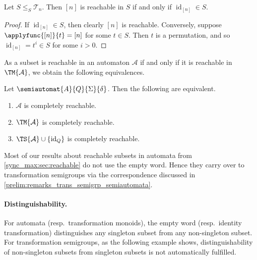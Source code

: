 \begin{proposition}\label{sync_max:prop:reach_whole_set}
	Let $S \le_S \mathcal T_n$.
	Then $[n]$ is reachable in $S$
	if and only if $\operatorname{id}_{[n]} \in S$.
\end{proposition}
\begin{proof}
	If $\operatorname{id}_{[n]} \in S$,
	then clearly $[n]$ is reachable. 
	Conversely, suppose $\applyfunc{[n]}{t} = [n]$
	for some $t \in S$.
	Then $t$ is a permutation, and so $\operatorname{id}_{[n]} = t^i \in S$
	for some $i > 0$.
\end{proof}

As a subset is reachable in an automaton $\mathcal A$ if and only if it is reachable in~$\TM{\mathcal A}$,
we obtain the following
equivalences.

\begin{proposition}
	Let $\semiautomat{A}{Q}{\Sigma}{\delta}$.
	Then the following are equivalent.
	
	\begin{enumerate}
		\item $\mathcal A$ is completely reachable.
		
		\item $\TM{\mathcal A}$ is completely reachable.
		
		\item $\TS{\mathcal A} \cup \{\operatorname{id}_Q\}$ is completely reachable.
	\end{enumerate}	
\end{proposition}

Most of our results about reachable subsets in automata from \cref{sync_max:sec:reachable} do not 
use the empty word. Hence they carry over to transformation
semigroups via the correspondence discussed in \cref{prelim:remarks_trans_semigrp_semiautomata}. 


\paragraph{Distinguishability.} For automata (resp.~transformation monoids), 
the empty word (resp.~identity transformation)
distinguishes any singleton subset from any non-singleton subset.
For transformation semigroups, as the following example shows,
distinguishability of non-singleton subsets from singleton subsets is not automatically fulfilled.

